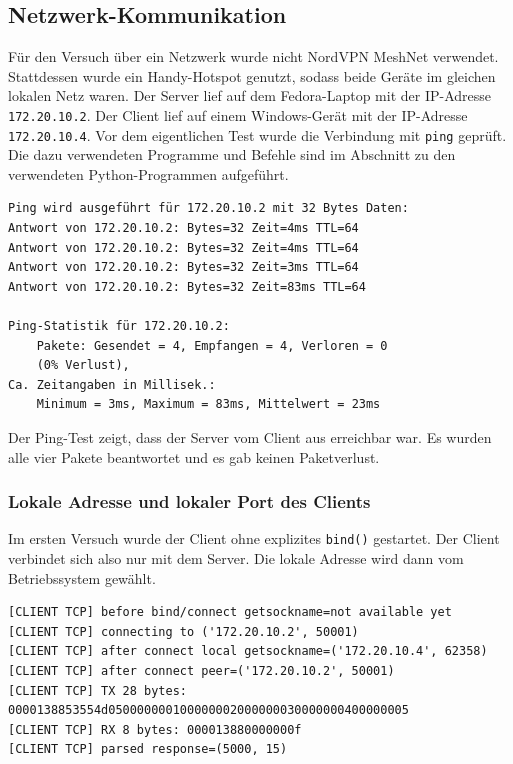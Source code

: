 \documentclass{kdiartcl}
\begin{document}
\subsection{Netzwerk-Kommunikation}

Für den Versuch über ein Netzwerk wurde nicht NordVPN MeshNet verwendet. Stattdessen wurde ein Handy-Hotspot genutzt, sodass beide Geräte im gleichen lokalen Netz waren. Der Server lief auf dem Fedora-Laptop mit der IP-Adresse \texttt{172.20.10.2}. Der Client lief auf einem Windows-Gerät mit der IP-Adresse \texttt{172.20.10.4}. Vor dem eigentlichen Test wurde die Verbindung mit \texttt{ping} geprüft. Die dazu verwendeten Programme und Befehle sind im Abschnitt zu den verwendeten Python-Programmen aufgeführt.

\begin{verbatim}
Ping wird ausgeführt für 172.20.10.2 mit 32 Bytes Daten:
Antwort von 172.20.10.2: Bytes=32 Zeit=4ms TTL=64
Antwort von 172.20.10.2: Bytes=32 Zeit=4ms TTL=64
Antwort von 172.20.10.2: Bytes=32 Zeit=3ms TTL=64
Antwort von 172.20.10.2: Bytes=32 Zeit=83ms TTL=64

Ping-Statistik für 172.20.10.2:
    Pakete: Gesendet = 4, Empfangen = 4, Verloren = 0
    (0% Verlust),
Ca. Zeitangaben in Millisek.:
    Minimum = 3ms, Maximum = 83ms, Mittelwert = 23ms
\end{verbatim}

Der Ping-Test zeigt, dass der Server vom Client aus erreichbar war. Es wurden alle vier Pakete beantwortet und es gab keinen Paketverlust.

\subsubsection{Lokale Adresse und lokaler Port des Clients}

Im ersten Versuch wurde der Client ohne explizites \texttt{bind()} gestartet. Der Client verbindet sich also nur mit dem Server. Die lokale Adresse wird dann vom Betriebssystem gewählt.

\begin{verbatim}
[CLIENT TCP] before bind/connect getsockname=not available yet
[CLIENT TCP] connecting to ('172.20.10.2', 50001)
[CLIENT TCP] after connect local getsockname=('172.20.10.4', 62358)
[CLIENT TCP] after connect peer=('172.20.10.2', 50001)
[CLIENT TCP] TX 28 bytes: 0000138853554d050000000100000002000000030000000400000005
[CLIENT TCP] RX 8 bytes: 000013880000000f
[CLIENT TCP] parsed response=(5000, 15)
\end{verbatim}
\end{document}
